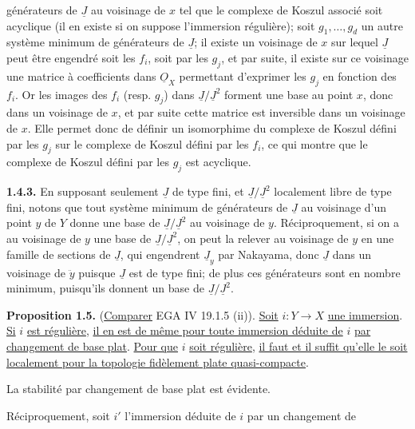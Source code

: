 
générateurs de $\underline{J}$ au voisinage de $x$ tel que le complexe de Koszul associé soit acyclique (il en existe si on suppose l'immersion régulière); soit $g_1,\ldots,g_d$ un autre système minimum de générateurs de $\underline{J}$; il existe un voisinage de $x$ sur lequel $\underline{J}$ peut être engendré soit les $f_i$, soit par les $g_j$, et par suite, il existe sur ce voisinage une matrice à coefficients dans $\underline{O}_X$ permettant d'exprimer les $g_j$ en fonction des $f_i$. Or les images des $f_i$ (resp. $g_j$) dans $\underline{J}/\underline{J}^2$ forment une base au point $x$, donc dans un voisinage de $x$, et par suite cette matrice est inversible dans un voisinage de $x$. Elle permet donc de définir un isomorphime du complexe de Koszul défini par les $g_j$ sur le complexe de Koszul défini par les $f_i$, ce qui montre que le complexe de Koszul défini par les $g_j$ est acyclique.

\textbf{1.4.3.} En supposant seulement $\underline{J}$ de type fini, et $\underline{J}/\underline{J}^2$ localement libre de type fini, notons que tout système minimum de générateurs de $\underline{J}$ au voisinage d'un point $y$ de $Y$ donne une base de $\underline{J}/\underline{J}^2$ au voisinage de $y$. Réciproquement, si on a au voisinage de $y$ une base de $\underline{J}/\underline{J}^2$, on peut la relever au voisinage de $y$ en une famille de sections de $\underline{J}$, qui engendrent $\underline{J}_y$ par Nakayama, donc $\underline{J}$ dans un voisinage de $\ddot y$ puisque $\underline{J}$ est de type fini; de plus ces générateurs sont en nombre minimum, puisqu'ils donnent un base de $\underline{J}/\underline{J}^2$.

\textbf{Proposition 1.5.} (\uline{Comparer} EGA IV 19.1.5 (ii)). \uline{Soit} $i:Y\longrightarrow X$ \uline{une immersion}. \uline{Si} $i$ \uline{est régulière}, \uline{il en est de même pour toute immersion déduite de} $i$ \uline{par changement de base plat}. \uline{Pour que} $i$ \uline{soit régulière}, \uline{il faut et il suffit qu'elle le soit localement pour la topologie fidèlement plate quasi-compacte}.

La stabilité par changement de base plat est évidente.

Réciproquement, soit $i'$ l'immersion déduite de $i$ par un changement de
